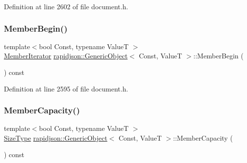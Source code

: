 Definition at line 2602 of file document.\+h.


\begin{DoxyCode}{0}

\end{DoxyCode}
\mbox{\label{classrapidjson_1_1_generic_object_ac3410e31a3a38bd7004daf8e76d5327c}} 
\subsubsection{\texorpdfstring{MemberBegin()}{MemberBegin()}}
{\footnotesize\ttfamily template$<$bool Const, typename ValueT $>$ \\
\mbox{\hyperlink{classrapidjson_1_1_generic_object_a598fd1d5f55289eca275847f0e8ef295}{Member\+Iterator}} \mbox{\hyperlink{classrapidjson_1_1_generic_object}{rapidjson\+::\+Generic\+Object}}$<$ Const, ValueT $>$\+::Member\+Begin (\begin{DoxyParamCaption}{ }\end{DoxyParamCaption}) const}



Definition at line 2595 of file document.\+h.


\begin{DoxyCode}{0}

\end{DoxyCode}
\mbox{\label{classrapidjson_1_1_generic_object_ae48a240f8168be407c6dd40864bee0f1}} 
\subsubsection{\texorpdfstring{MemberCapacity()}{MemberCapacity()}}
{\footnotesize\ttfamily template$<$bool Const, typename ValueT $>$ \\
\mbox{\hyperlink{namespacerapidjson_a44eb33eaa523e36d466b1ced64b85c84}{Size\+Type}} \mbox{\hyperlink{classrapidjson_1_1_generic_object}{rapidjson\+::\+Generic\+Object}}$<$ Const, ValueT $>$\+::Member\+Capacity (\begin{DoxyParamCaption}{ }\end{DoxyParamCaption}) const}



